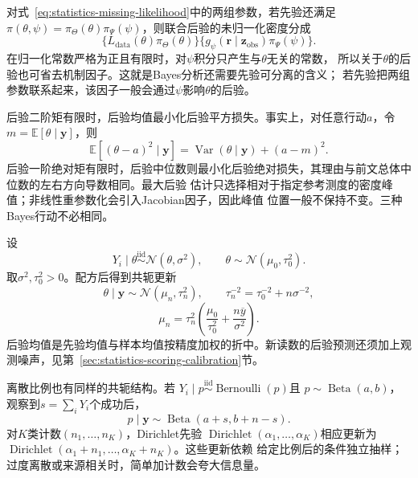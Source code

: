 对式~\eqref{eq:statistics-missing-likelihood}中的两组参数，若先验还满足
\(\pi(\theta,\psi)=\pi_\Theta(\theta)\pi_\Psi(\psi)\)，则联合后验的未归一化密度分成
\[
 \{L_{\mathrm{data}}(\theta)\pi_\Theta(\theta)\}
 \{g_\psi(\bm r\mid\bm z_{\mathrm{obs}})\pi_\Psi(\psi)\}.
\]
在归一化常数严格为正且有限时，对\(\psi\)积分只产生与\(\theta\)无关的常数，
所以关于\(\theta\)的后验也可省去机制因子。这就是Bayes分析还需要先验可分离的含义；
若先验把两组参数联系起来，该因子一般会通过\(\psi\)影响\(\theta\)的后验。

后验二阶矩有限时，后验均值最小化后验平方损失。事实上，对任意行动\(a\)，令
\(m=\mathbb{E}[\theta\mid\bm y]\)，则
\[
  \mathbb{E}[(\theta-a)^2\mid\bm y]
  =\operatorname{Var}(\theta\mid\bm y)+(a-m)^2.
\]
后验一阶绝对矩有限时，后验中位数则最小化后验绝对损失，其理由与前文总体中位数的左右方向导数相同。最大后验
估计只选择相对于指定参考测度的密度峰值；非线性重参数化会引入Jacobian因子，因此峰值
位置一般不保持不变。三种Bayes行动不必相同。

设
\[
  Y_i\mid\theta\overset{\mathrm{iid}}{\sim}\mathcal N(\theta,\sigma^2),
  \qquad
  \theta\sim\mathcal N(\mu_0,\tau_0^2).
\]
取\(\sigma^2,\tau_0^2>0\)。配方后得到共轭更新
\[
  \theta\mid\bm y
  \sim\mathcal N(\mu_n,\tau_n^2),\qquad
  \tau_n^{-2}=\tau_0^{-2}+n\sigma^{-2},
\]
\[
  \mu_n=\tau_n^2
  \left(\frac{\mu_0}{\tau_0^2}+\frac{n\overline y}{\sigma^2}\right).
\]
后验均值是先验均值与样本均值按精度加权的折中。新读数的后验预测还须加上观测噪声，见第~\ref{sec:statistics-scoring-calibration}节。

离散比例也有同样的共轭结构。若
\(Y_i\mid p\overset{\mathrm{iid}}{\sim}\operatorname{Bernoulli}(p)\)且
\(p\sim\operatorname{Beta}(a,b)\)，观察到\(s=\sum_iY_i\)个成功后，
\[
  p\mid\bm y\sim\operatorname{Beta}(a+s,b+n-s).
\]
对\(K\)类计数\((n_1,\ldots,n_K)\)，Dirichlet先验
\(\operatorname{Dirichlet}(\alpha_1,\ldots,\alpha_K)\)相应更新为
\(\operatorname{Dirichlet}(\alpha_1+n_1,\ldots,\alpha_K+n_K)\)。这些更新依赖
给定比例后的条件独立抽样；过度离散或来源相关时，简单加计数会夸大信息量。

